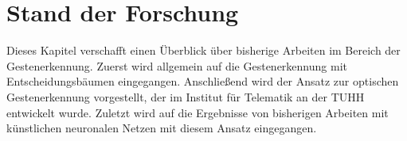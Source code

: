 \chapter{Stand der Forschung}
Dieses Kapitel verschafft einen Überblick über bisherige Arbeiten im Bereich der Gestenerkennung. Zuerst wird allgemein auf die Gestenerkennung mit Entscheidungsbäumen eingegangen. Anschließend wird der Ansatz
zur optischen Gestenerkennung vorgestellt, der im Institut für Telematik an der TUHH entwickelt wurde. Zuletzt wird auf die Ergebnisse von bisherigen Arbeiten mit künstlichen neuronalen Netzen mit diesem Ansatz eingegangen.




